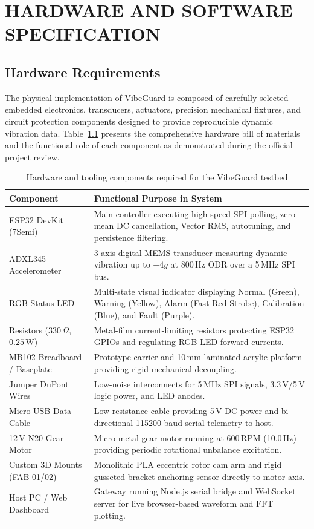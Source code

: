 \chapter{HARDWARE AND SOFTWARE SPECIFICATION}
\label{ch:specifications}

\section{Hardware Requirements}
\hspace{2em}The physical implementation of VibeGuard is composed of carefully selected embedded electronics, transducers, actuators, precision mechanical fixtures, and circuit protection components designed to provide reproducible dynamic vibration data. Table~\ref{tab:components_required} presents the comprehensive hardware bill of materials and the functional role of each component as demonstrated during the official project review.

\begin{table}[H]
\centering
\caption{Hardware and tooling components required for the VibeGuard testbed}
\label{tab:components_required}
\small
\begin{tabularx}{\textwidth}{l X}
\toprule
\textbf{Component} & \textbf{Functional Purpose in System} \\
\midrule
ESP32 DevKit (7Semi) & Main controller executing high-speed SPI polling, zero-mean DC cancellation, Vector RMS, autotuning, and persistence filtering. \\
ADXL345 Accelerometer & 3-axis digital MEMS transducer measuring dynamic vibration up to $\pm 4g$ at 800\,Hz ODR over a 5\,MHz SPI bus. \\
RGB Status LED & Multi-state visual indicator displaying Normal (Green), Warning (Yellow), Alarm (Fast Red Strobe), Calibration (Blue), and Fault (Purple). \\
Resistors ($330\,\Omega$, $0.25$\,W) & Metal-film current-limiting resistors protecting ESP32 GPIOs and regulating RGB LED forward currents. \\
MB102 Breadboard / Baseplate & Prototype carrier and 10\,mm laminated acrylic platform providing rigid mechanical decoupling. \\
Jumper DuPont Wires & Low-noise interconnects for 5\,MHz SPI signals, 3.3\,V/5\,V logic power, and LED anodes. \\
Micro-USB Data Cable & Low-resistance cable providing 5\,V DC power and bi-directional 115200 baud serial telemetry to host. \\
12\,V N20 Gear Motor & Micro metal gear motor running at 600\,RPM (10.0\,Hz) providing periodic rotational unbalance excitation. \\
Custom 3D Mounts (FAB-01/02) & Monolithic PLA eccentric rotor cam arm and rigid gusseted bracket anchoring sensor directly to motor axis. \\
Host PC / Web Dashboard & Gateway running Node.js serial bridge and WebSocket server for live browser-based waveform and FFT plotting. \\
\bottomrule
\end{tabularx}
\end{table}

